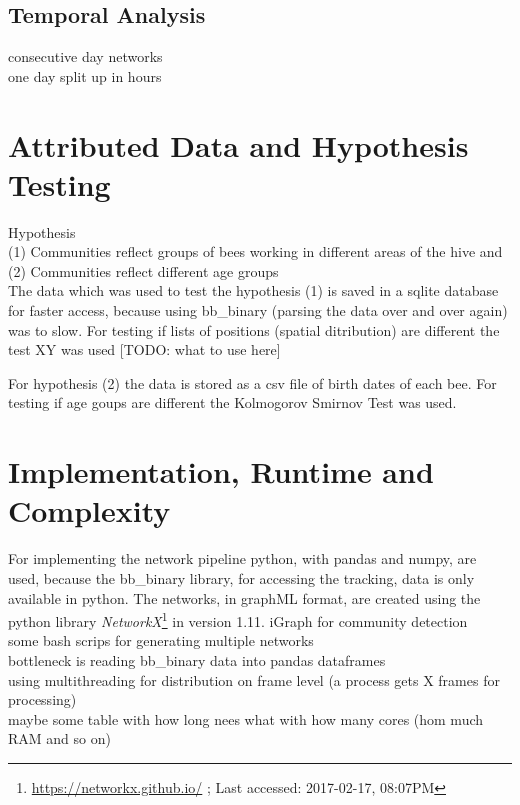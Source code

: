 \subsection{Temporal Analysis}
consecutive day networks\\
one day split up in hours\\

\section{Attributed Data and Hypothesis Testing}
Hypothesis\\
(1) Communities reflect groups of bees working in different areas of the hive and\\
(2) Communities reflect different age groups\\

The data which was used to test the hypothesis (1) is saved in a sqlite database for faster access, because using bb\_binary (parsing the data over and over again) was to slow. For testing if lists of positions (spatial ditribution) are different the test XY was used [TODO: what to use here]

For hypothesis (2) the data is stored as a csv file of birth dates of each bee. For testing if age goups are different the Kolmogorov Smirnov Test was used.

\section{Implementation, Runtime and Complexity}
For implementing the network pipeline python, with pandas and numpy, are used, because the bb\_binary library, for accessing the tracking, data is only available in python. The networks, in graphML format, are created using the python library \emph{NetworkX}\footnote{\url{https://networkx.github.io/} ; Last accessed: 2017-02-17, 08:07PM} in version 1.11.
iGraph for community detection\\
some bash scrips for generating multiple networks\\

bottleneck is reading bb\_binary data into pandas dataframes\\
using multithreading for distribution on frame level (a process gets X frames for processing)\\

maybe some table with how long nees what with how many cores (hom much RAM and so on)\\